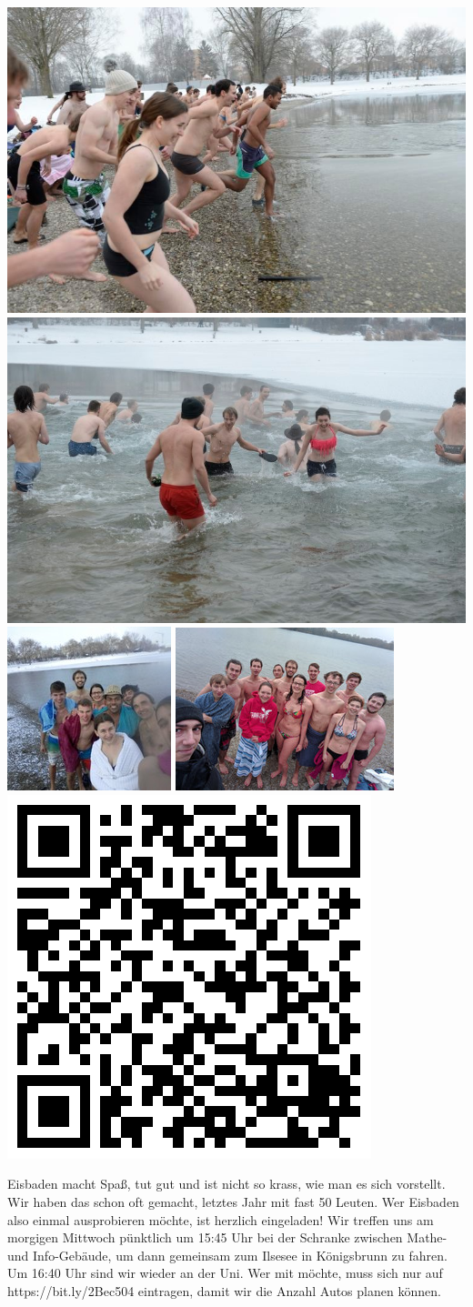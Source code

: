 \documentclass[a4paper,ngerman,landscape]{scrartcl}
\begin{document}
\begin{center}
  \includegraphics[height=0.15\textwidth]{eisbaden-7}
  \includegraphics[height=0.15\textwidth]{eisbaden-5}
  \includegraphics[height=0.15\textwidth]{eisbaden-1}
  \includegraphics[height=0.15\textwidth]{eisbaden-2}
  \includegraphics[height=0.15\textwidth]{eisbaden-qrcode6}
  \vspace{1em}

  \Huge

  \large
  \begin{minipage}{0.92\textwidth}
    \renewcommand{\baselinestretch}{1.3}

    \setlength\parskip{\medskipamount}
    \vspace{0.3em}
    Eisbaden macht Spaß, tut gut und ist nicht so krass, wie man es sich vorstellt.
    Wir haben das schon oft gemacht, letztes Jahr mit fast
    50 Leuten. Wer Eisbaden also einmal ausprobieren möchte, ist herzlich
    eingeladen!
    Wir treffen uns am morgigen Mittwoch pünktlich um 15:45 Uhr bei der
    Schranke zwischen Mathe- und Info-Gebäude, um dann gemeinsam zum Ilsesee in
    Königsbrunn zu fahren. Um 16:40 Uhr sind wir wieder an der Uni.
    Wer mit möchte, muss sich nur auf \textsf{https:/$\!$/bit.ly/2Bec504} eintragen, damit
    wir die Anzahl Autos planen können.
    \vspace{0.3em}
  \end{minipage}


\end{center}
\end{document}
